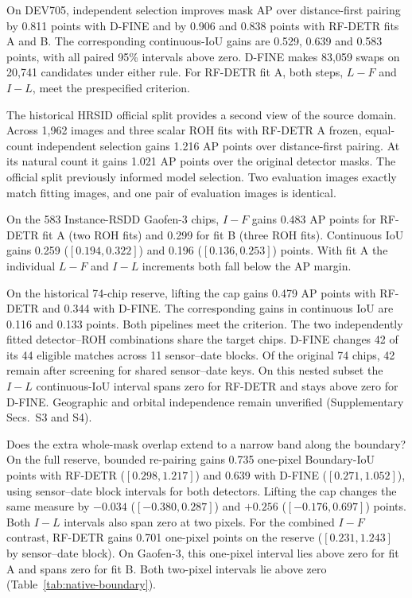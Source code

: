 \documentclass[journal]{IEEEtran}
\begin{document}
On DEV705, independent selection improves mask AP over distance-first pairing by 0.811 points with D-FINE and by 0.906 and 0.838 points with RF-DETR fits A and B. The corresponding continuous-IoU gains are 0.529, 0.639 and 0.583 points, with all paired 95\% intervals above zero. D-FINE makes 83,059 swaps on 20,741 candidates under either rule. For RF-DETR fit A, both steps, \(L-F\) and \(I-L\), meet the prespecified criterion.

The historical HRSID official split provides a second view of the source domain. Across 1,962 images and three scalar ROH fits with RF-DETR A frozen, equal-count independent selection gains 1.216 AP points over distance-first pairing. At its natural count it gains 1.021 AP points over the original detector masks. The official split previously informed model selection. Two evaluation images exactly match fitting images, and one pair of evaluation images is identical.

On the 583 Instance-RSDD Gaofen-3 chips, \(I-F\) gains 0.483 AP points for RF-DETR fit A (two ROH fits) and 0.299 for fit B (three ROH fits). Continuous IoU gains 0.259 (\([0.194,0.322]\)) and 0.196 (\([0.136,0.253]\)) points. With fit A the individual \(L-F\) and \(I-L\) increments both fall below the AP margin.

On the historical 74-chip reserve, lifting the cap gains 0.479 AP points with RF-DETR and 0.344 with D-FINE. The corresponding gains in continuous IoU are 0.116 and 0.133 points. Both pipelines meet the criterion. The two independently fitted detector--ROH combinations share the target chips. D-FINE changes 42 of its 44 eligible matches across 11 sensor--date blocks. Of the original 74 chips, 42 remain after screening for shared sensor--date keys. On this nested subset the \(I-L\) continuous-IoU interval spans zero for RF-DETR and stays above zero for D-FINE. Geographic and orbital independence remain unverified (Supplementary Secs.~S3 and S4).

Does the extra whole-mask overlap extend to a narrow band along the boundary? On the full reserve, bounded re-pairing gains 0.735 one-pixel Boundary-IoU points with RF-DETR (\([0.298,1.217]\)) and 0.639 with D-FINE (\([0.271,1.052]\)), using sensor--date block intervals for both detectors. Lifting the cap changes the same measure by \(-0.034\) (\([-0.380,0.287]\)) and \(+0.256\) (\([-0.176,0.697]\)) points. Both \(I-L\) intervals also span zero at two pixels. For the combined \(I-F\) contrast, RF-DETR gains 0.701 one-pixel points on the reserve (\([0.231,1.243]\) by sensor--date block). On Gaofen-3, this one-pixel interval lies above zero for fit A and spans zero for fit B. Both two-pixel intervals lie above zero (Table~\ref{tab:native-boundary}).
\end{document}
